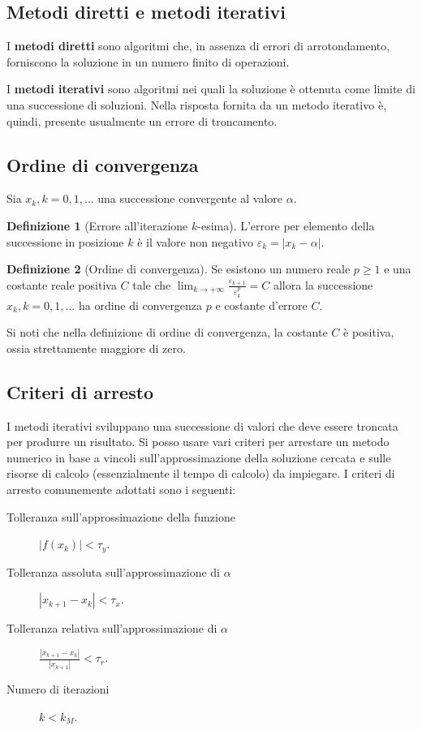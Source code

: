 \documentclass[12pt]{article}
\theoremstyle{plain}%
\theoremstyle{definition}
\newtheorem{defn}{Definizione}[section]
\theoremstyle{remark}
\begin{document}
\subsection{Metodi diretti e metodi iterativi}

I \textbf{metodi diretti} sono algoritmi che, in assenza di errori di arrotondamento, forniscono la soluzione in un numero finito di operazioni.

I \textbf{metodi iterativi} sono algoritmi nei quali la soluzione è ottenuta come limite di una successione di soluzioni. Nella risposta fornita da un metodo iterativo è, quindi, presente usualmente un errore di troncamento.

\subsection{Ordine di convergenza}

Sia $x_k, k = 0, 1,\ldots$ una successione convergente al valore $\alpha$.

\begin{defn}[Errore all'iterazione $k$-esima]
L'errore per elemento della successione in posizione $k$ è il valore non negativo
$\varepsilon_k = |x_k - \alpha|$.
\end{defn}

\begin{defn}[Ordine di convergenza]
Se esistono un numero reale $p \geq 1$ e una costante reale positiva $C$
tale che
$\lim_{k\to+\infty} \frac{\varepsilon_{k+1}}{\varepsilon_{k}^p}=C$
allora la successione $x_k, k = 0, 1,\ldots$ ha ordine di convergenza $p$
e costante d'errore $C$.
\end{defn}

Si noti che nella definizione di ordine di convergenza, la costante $C$
è positiva, ossia strettamente maggiore di zero.

\subsection{Criteri di arresto}

I metodi iterativi sviluppano una successione di valori che deve essere troncata
per produrre un risultato.
Si posso usare vari criteri per arrestare un metodo numerico in base a vincoli
sull'approssimazione della soluzione cercata e sulle risorse di calcolo
(essenzialmente il tempo di calcolo) da impiegare.
I criteri di arresto comunemente adottati sono i seguenti:

\begin{description}
\item[Tolleranza sull'approssimazione della funzione]$|f(x_k)| < \tau_y$.
\item[Tolleranza assoluta sull'approssimazione di $\alpha$] $|x_{k + 1} - x_{k}| < \tau_x$.
\item[Tolleranza relativa sull'approssimazione di $\alpha$] $\frac{|x_{k + 1} - x_{k}|}{|x_{k+1}|} < \tau_r$.
\item[Numero di iterazioni] $k < k_M$. 
\end{description}
\end{document}
